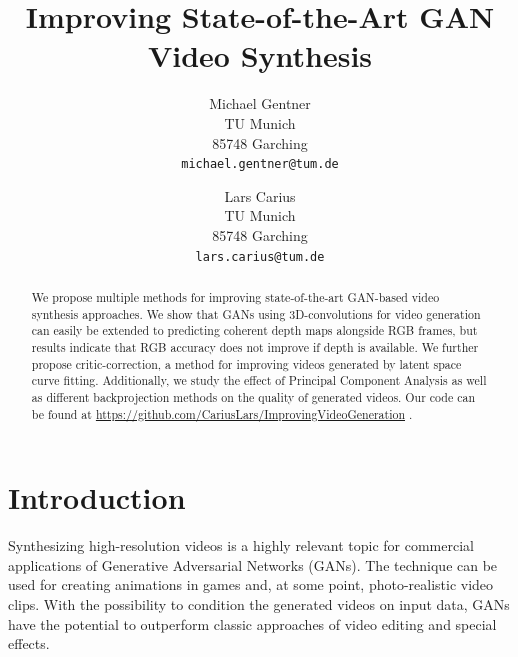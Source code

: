 \documentclass[10pt,twocolumn,letterpaper]{article}
\begin{document}
\setlength{\textfloatsep}{0.7\baselineskip plus 0.2\baselineskip minus 0.5\baselineskip}
\setlength{\abovedisplayskip}{4pt}
\setlength{\belowdisplayskip}{4pt}
\setlength{\abovedisplayshortskip}{0pt}
\setlength{\belowdisplayshortskip}{0pt}
\title{Improving State-of-the-Art GAN Video Synthesis}

\author{Michael Gentner\\
TU Munich\\
85748 Garching\\
{\tt\small michael.gentner@tum.de}
\and
Lars Carius\\
TU Munich\\
85748 Garching\\
{\tt\small lars.carius@tum.de}
}

\maketitle

\begin{abstract}
We propose multiple methods for improving state-of-the-art GAN-based video synthesis approaches. We show that GANs using 3D-convolutions for video generation can easily be extended to predicting coherent depth maps alongside RGB frames, but results indicate that RGB accuracy does not improve if depth is available. We further propose critic-correction, a method for improving videos generated by latent space curve fitting. Additionally, we study the effect of Principal Component Analysis as well as different backprojection methods on the quality of generated videos. Our code can be found at \url{https://github.com/CariusLars/ImprovingVideoGeneration} .
\end{abstract}

\section{Introduction}

Synthesizing high-resolution videos is a highly relevant topic for commercial applications of Generative Adversarial Networks (GANs). The technique can be used for creating animations in games and, at some point, photo-realistic video clips. With the possibility to condition the generated videos on input data, GANs have the potential to outperform classic approaches of video editing and special effects.
\end{document}
